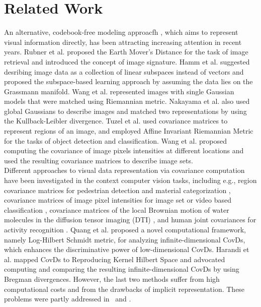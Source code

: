 \documentclass[review]{elsarticle}
\begin{document}
\section{Related Work}
	\indent An alternative, codebook-free modeling approacfh \cite{wang2016towards}, which aims to represent visual information directly, has been attracting increasing attention in recent years. Rubner et al.\cite{rubner2000earth} proposed the Earth Mover's Distance for the task of image retrieval and introduced the concept of image signature. Hamm et al.\cite{hamm2008grassmann,hamm2009extended} suggested desribing image data as a collection of linear subspaces instead of vectors and proposed the subspace-based learning approach by assuming the data lies on the Grassmann manifold. Wang et al.\cite{wang2016towards} represented images with single Gaussian models that were matched  using Riemannian metric. Nakayama et al.\cite{nakayama2010global} also used global Gaussians to describe images and matched two representations by using the Kullback-Leibler divergence. Tuzel et al.\cite{tuzel2006region,tuzel2008pedestrian} used covariance matrices to represent regions of an image, and employed Affine Invariant Riemannian Metric \cite{pennec2006riemannian} for the tasks of object detection and classification. Wang et al.\cite{wang2012covariance} proposed computing the covariance of image pixels intensities at different locations and used the resulting covariance matrices to describe image sets.\\
	
	Different approaches to visual data representation via covariance computation have been investigated in the context  computer vision tasks, including e.g., region covariance matrices for pedestrian detection \cite{tuzel2008pedestrian} and material categorization \cite{faraki2015approximate}, covariance matrices of image pixel intensities for image set or video based classification \cite{wang2012covariance}, covariance matrices of the local Brownian motion of water molecules in the diffusion tensor imaging (DTI) \cite{pennec2006riemannian}, and human joint covariances for activity recognition \cite{hussein2013human}. Quang et al.\cite{quang2014log} proposed a novel computational framework, namely Log-Hilbert Schmidt metric, for analyzing infinite-dimensional CovDs, which enhances the discriminative power of low-dimensional CovDs. Harandi et al.\cite{harandi2014bregman} mapped CovDs to Reproducing Kernel Hilbert Space and advocated computing and comparing the resulting infinite-dimensional CovDs by using Bregman divergences. However, the last two methods suffer from high computational costs and from the drawbacks of implicit representation. These problems were partly addressed in~\cite{faraki2015approximate} and \cite{chen2018riemannian}.
	
\end{document}
